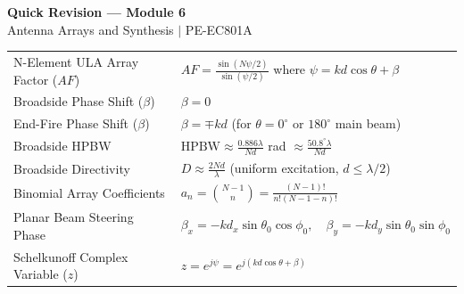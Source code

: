 \documentclass[12pt,a4paper]{article}
\renewcommand{\arraystretch}{1.45}
\begin{document}
\newpage
\begin{center}
  {\large\bfseries\color{myred} Quick Revision --- Module 6}\\[3pt]
  {\small\color{mydark} Antenna Arrays and Synthesis $|$ PE-EC801A}
\end{center}
\noindent{\color{myred}\rule{\linewidth}{1.2pt}}
\vspace{4pt}

\begin{tcolorbox}[formulabox, title={\textbf{Key Formulas and Metrics at a Glance}}]
\renewcommand{\arraystretch}{1.35}
\begin{tabularx}{\linewidth}{B{5.2cm} X}
N-Element ULA Array Factor ($AF$) & $AF = \frac{\sin(N\psi/2)}{\sin(\psi/2)}$ \quad where $\psi = kd\cos\theta + \beta$ \\[4pt]
Broadside Phase Shift ($\beta$) & $\beta = 0$ \\[4pt]
End-Fire Phase Shift ($\beta$) & $\beta = \mp kd$ \quad (for $\theta = 0^\circ$ or $180^\circ$ main beam) \\[4pt]
Broadside HPBW & $\text{HPBW} \approx \frac{0.886\lambda}{Nd}$ rad $\approx \frac{50.8^\circ\lambda}{Nd}$ \\[4pt]
Broadside Directivity & $D \approx \frac{2Nd}{\lambda}$ \quad (uniform excitation, $d \le \lambda/2$) \\[4pt]
Binomial Array Coefficients & $a_n = \binom{N-1}{n} = \frac{(N-1)!}{n!(N-1-n)!}$ \\[4pt]
Planar Beam Steering Phase & $\beta_x = -k d_x \sin\theta_0 \cos\phi_0, \quad \beta_y = -k d_y \sin\theta_0 \sin\phi_0$ \\[4pt]
Schelkunoff Complex Variable ($z$) & $z = e^{j\psi} = e^{j(kd\cos\theta + \beta)}$ \\
\end{tabularx}
\end{tcolorbox}
\end{document}
